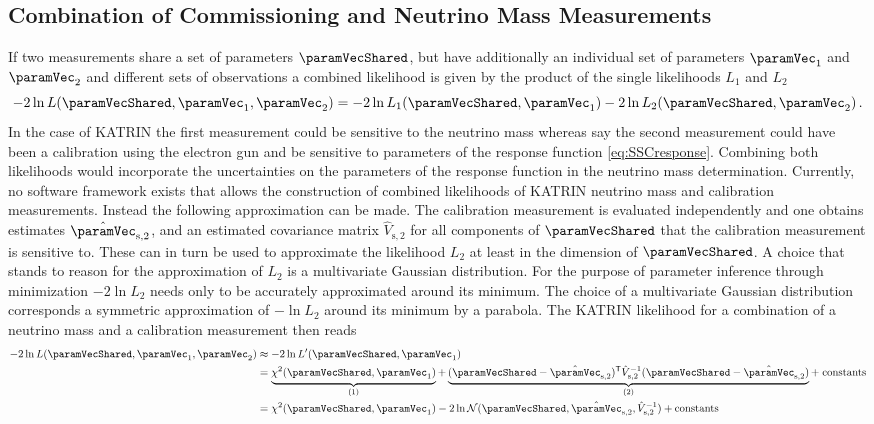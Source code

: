 \subsection{Combination of Commissioning and Neutrino Mass Measurements}
If two measurements share a set of parameters $\paramVecShared$, but have additionally an individual set of parameters $\paramVec_1$ and $\paramVec_2$ and different sets of observations a combined likelihood is given by the product of the single likelihoods $L_1$ and $L_2$
\begin{equation}
-2\ln L(\paramVecShared, \paramVec_1, \paramVec_2) =  
-2\ln L_1(\paramVecShared, \paramVec_1)
-2\ln L_2(\paramVecShared, \paramVec_2)
\fullstop
\end{equation}
In the case of KATRIN the first measurement could be sensitive to the neutrino mass whereas say the second measurement could have been a calibration using the electron gun and be sensitive to parameters of the response function \eqref{eq:SSCresponse}. Combining both likelihoods would incorporate the uncertainties on the parameters of the response function in the neutrino mass determination. Currently, no software framework exists that allows the construction of combined likelihoods of KATRIN neutrino mass and calibration measurements. Instead the following approximation can be made. The calibration measurement is evaluated independently and one obtains estimates $\hat{\paramVec}_\mathrm{s,2}$, and an estimated covariance matrix $\hat{V}_\mathrm{s,2}$ for all components of $\paramVecShared$ that the calibration measurement is sensitive to. These can in turn be used to approximate the likelihood $L_2$ at least in the dimension of $\paramVecShared$. A choice that stands to reason for the approximation of $L_2$ is a multivariate Gaussian distribution. For the purpose of parameter inference through minimization $-2\ln L_2$ needs only to be accurately approximated around its minimum. The choice of a multivariate Gaussian distribution corresponds a symmetric approximation of $-\ln L_2$ around its minimum by a parabola. The KATRIN likelihood for a combination of a neutrino mass and a calibration measurement then reads
\begin{equation}
\begin{split}
\label{eq:penalizedLikelihood}
-2\ln L(\paramVecShared, \paramVec_1, \paramVec_2) &\approx
-2\ln L^\prime(\paramVecShared, \paramVec_1) \\ &=
\underbrace{
	\chi^2(\paramVecShared, \paramVec_1)
	\vphantom{(\paramVecShared - \hat{\paramVec}_\mathrm{s,2})^{\mathsf{T}}}
}_{(1)}
+
\underbrace{
	(\paramVecShared - \hat{\paramVec}_\mathrm{s,2})^{\mathsf{T}}
	\hat{V}_\mathrm{s,2}^{-1}
	(\paramVecShared - \hat{\paramVec}_\mathrm{s,2})
}_{(2)} +\; 
\mathrm{ constants}\\ &=
\chi^2(\paramVecShared, \paramVec_1) 
-2\ln \mathcal{N}(\paramVecShared, \hat{\paramVec}_\mathrm{s,2}, \hat{V}_\mathrm{s,2}^{-1}) +
\mathrm{ constants}
\end{split}
\end{equation}
